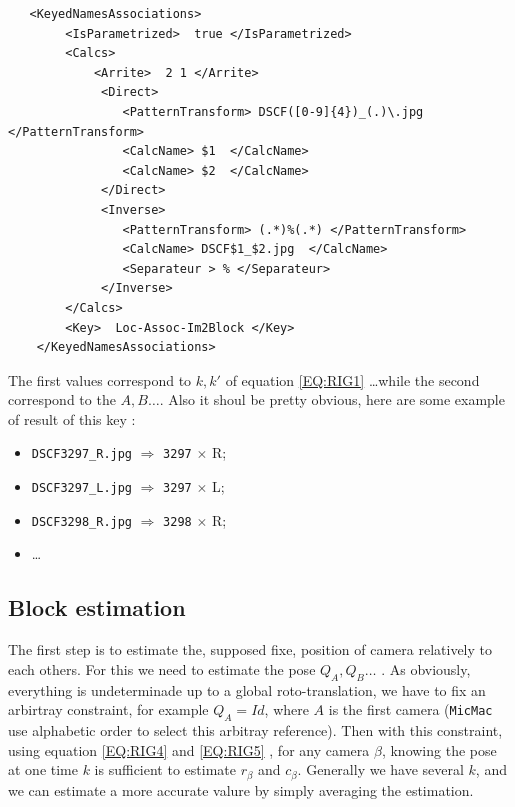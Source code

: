 \begin{verbatim}
   <KeyedNamesAssociations>
        <IsParametrized>  true </IsParametrized>
        <Calcs>
            <Arrite>  2 1 </Arrite>
             <Direct>
                <PatternTransform> DSCF([0-9]{4})_(.)\.jpg   </PatternTransform>
                <CalcName> $1  </CalcName>
                <CalcName> $2  </CalcName>
             </Direct>
             <Inverse>
                <PatternTransform> (.*)%(.*) </PatternTransform>
                <CalcName> DSCF$1_$2.jpg  </CalcName>
                <Separateur > % </Separateur>
             </Inverse>
        </Calcs>
        <Key>  Loc-Assoc-Im2Block </Key>
    </KeyedNamesAssociations>
\end{verbatim}

The first values correspond to $k,k'$ of equation   \ref{EQ:RIG1} \dots while the second correspond
to the $A,B \dots$.  Also it shoul be pretty obvious, here are some example of result of this key :

\begin{itemize}
    \item {\tt DSCF3297\_R.jpg}  $\Rightarrow$   {\tt 3297}  $\times$    {R};
    \item {\tt DSCF3297\_L.jpg}  $\Rightarrow$   {\tt 3297}  $\times$    {L};
    \item {\tt DSCF3298\_R.jpg}  $\Rightarrow$   {\tt 3298}  $\times$    {R};
    \item \dots
\end{itemize}



\subsection{Block estimation}

The first step is to estimate the, supposed fixe, position of camera relatively to each others. For this
we need to estimate the pose  $Q_A,Q_B \dots$ . As obviously,  everything is undeterminade up to a global
roto-translation, we have to fix an arbirtray constraint, for example $Q_A=Id$, where $A$ is the first
camera ({\tt MicMac} use alphabetic order to select this arbitray reference).  Then with this constraint,
using equation \ref{EQ:RIG4}  and \ref{EQ:RIG5} , for any camera $\beta$, knowing the pose at one time 
$k$ is sufficient to estimate  $r_{\beta}$ and $c_{\beta}$. Generally we have several $k$, and we can
estimate a more accurate valure by simply averaging the estimation.

